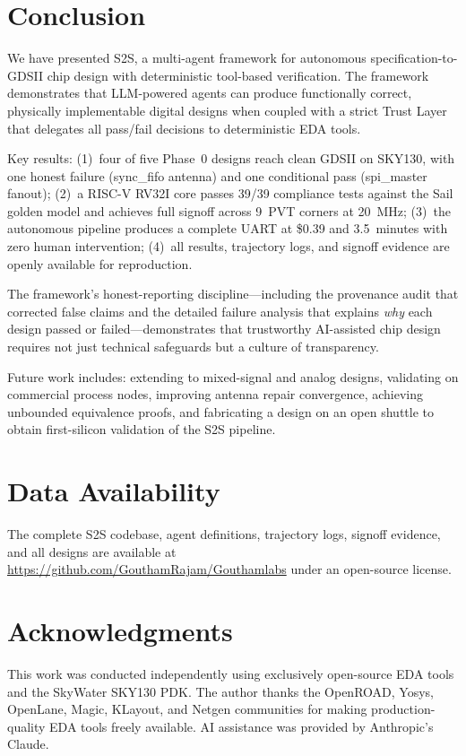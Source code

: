 \documentclass[journal]{IEEEtran}
\begin{document}
\section{Conclusion}
\label{sec:conclusion}

We have presented S2S, a multi-agent framework for autonomous specification-to-GDSII chip design with deterministic tool-based verification. The framework demonstrates that LLM-powered agents can produce functionally correct, physically implementable digital designs when coupled with a strict Trust Layer that delegates all pass/fail decisions to deterministic EDA tools.

Key results: (1)~four of five Phase~0 designs reach clean GDSII on SKY130, with one honest failure (sync\_fifo antenna) and one conditional pass (spi\_master fanout); (2)~a RISC-V RV32I core passes 39/39 compliance tests against the Sail golden model and achieves full signoff across 9~PVT corners at 20~MHz; (3)~the autonomous pipeline produces a complete UART at \$0.39 and 3.5~minutes with zero human intervention; (4)~all results, trajectory logs, and signoff evidence are openly available for reproduction.

The framework's honest-reporting discipline---including the provenance audit that corrected false claims and the detailed failure analysis that explains \emph{why} each design passed or failed---demonstrates that trustworthy AI-assisted chip design requires not just technical safeguards but a culture of transparency.

Future work includes: extending to mixed-signal and analog designs, validating on commercial process nodes, improving antenna repair convergence, achieving unbounded equivalence proofs, and fabricating a design on an open shuttle to obtain first-silicon validation of the S2S pipeline.

\section*{Data Availability}

The complete S2S codebase, agent definitions, trajectory logs, signoff evidence, and all designs are available at \url{https://github.com/GouthamRajam/Gouthamlabs} under an open-source license.

\section*{Acknowledgments}

This work was conducted independently using exclusively open-source EDA tools and the SkyWater SKY130 PDK. The author thanks the OpenROAD, Yosys, OpenLane, Magic, KLayout, and Netgen communities for making production-quality EDA tools freely available. AI assistance was provided by Anthropic's Claude.
\end{document}
